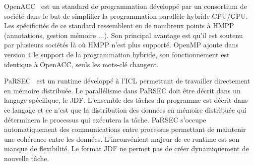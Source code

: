OpenACC~\cite{OpenACC} est un standard de programmation développé par un consortium de société dans le but de simplifier la programmation parallèle hybride CPU/GPU.
%
Les spécificités de ce standard ressemblent en de nombreux points à HMPP (annotations, gestion mémoire ...).
%
Son principal avantage est qu'il est soutenu par plusieurs sociétés là où HMPP n'est plus supporté.
%
OpenMP ajoute dans version 4 le support de la programmation hybride, son fonctionnement est identique à OpenACC, seuls les mots-clé changent.

PaRSEC~\cite{PaRSEC} est un runtime développé à l'ICL permettant de travailler directement en mémoire distribuée.
%
Le parallélisme dans PaRSEC doit être décrit dans un langage spécifique, le JDF.
%
L'ensemble des tâches du programme est décrit dans ce langage et ce n'est que la distribution des données en mémoire distribuée qui déterminera le processus qui exécutera la tâche.
%
PaRSEC s'occupe automatiquement des communications entre processus permettant de maintenir une cohérence entre les données.
%
L'inconvénient majeur de ce runtime est son manque de flexibilité.
%
Le format JDF ne permet pas de créer dynamiquement de nouvelle tâche.
